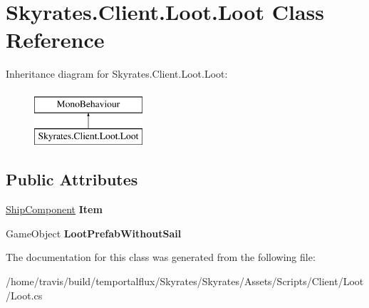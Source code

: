 \hypertarget{class_skyrates_1_1_client_1_1_loot_1_1_loot}{\section{Skyrates.\-Client.\-Loot.\-Loot Class Reference}
\label{class_skyrates_1_1_client_1_1_loot_1_1_loot}
}
Inheritance diagram for Skyrates.\-Client.\-Loot.\-Loot\-:\begin{figure}[H]
\begin{center}
\leavevmode
\includegraphics[height=2.000000cm]{class_skyrates_1_1_client_1_1_loot_1_1_loot}
\end{center}
\end{figure}
\subsection*{Public Attributes}
\begin{DoxyCompactItemize}
\item 
\hypertarget{class_skyrates_1_1_client_1_1_loot_1_1_loot_a295eba520dd781c17f67c70799aa2322}{\hyperlink{class_skyrates_1_1_client_1_1_ship_1_1_ship_component}{Ship\-Component} {\bfseries Item}}\label{class_skyrates_1_1_client_1_1_loot_1_1_loot_a295eba520dd781c17f67c70799aa2322}

\item 
\hypertarget{class_skyrates_1_1_client_1_1_loot_1_1_loot_ad63bdbaca44faa51af93fc8f480206b4}{Game\-Object {\bfseries Loot\-Prefab\-Without\-Sail}}\label{class_skyrates_1_1_client_1_1_loot_1_1_loot_ad63bdbaca44faa51af93fc8f480206b4}

\end{DoxyCompactItemize}


The documentation for this class was generated from the following file\-:\begin{DoxyCompactItemize}
\item 
/home/travis/build/temportalflux/\-Skyrates/\-Skyrates/\-Assets/\-Scripts/\-Client/\-Loot/Loot.\-cs\end{DoxyCompactItemize}
